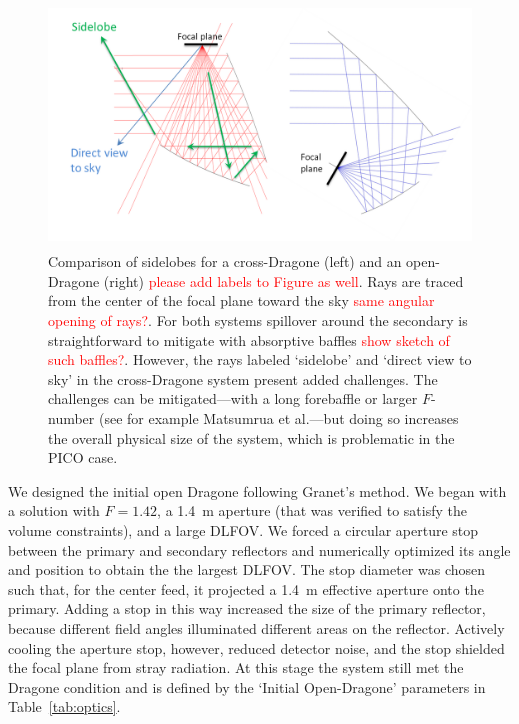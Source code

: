 \documentclass[]{spie}  %
\newcommand{\comr}[1]{\textcolor{red}{#1}}
\begin{document}
\begin{figure} [ht]
\begin{center}
\includegraphics[height=6.5cm]{sidelobes.png}
\end{center}
\caption { \label{fig:sidelobes} 
Comparison of sidelobes for a cross-Dragone (left) and an open-Dragone (right) \comr{please add labels to Figure as well}.  
Rays are traced from the center of the focal plane toward the sky \comr{same angular opening of rays?}.
For both systems spillover around the secondary is straightforward to mitigate with absorptive baffles \comr{show sketch of such baffles?}.  
However, the rays labeled `sidelobe' and `direct view to 
sky' in the cross-Dragone system present added challenges. The challenges can be mitigated---with a long forebaffle or larger $F$-number (see
for example Matsumrua et al.\cite{LB2016_optics}---but
doing so increases the overall physical size of the system, which is problematic in the PICO case.}
\end{figure} 

We designed the initial open Dragone following Granet's method\cite{granet2001}. 
We began with a solution with $F=1.42$, a 1.4~m aperture (that was verified to satisfy the volume constraints), and a large 
DLFOV.  We forced a circular aperture stop 
between the primary and secondary reflectors and numerically optimized its angle and position to obtain the 
the largest DLFOV.  The stop diameter was chosen such that, for the center feed, it projected a 
1.4~m effective aperture onto the primary. 
Adding a stop in this way increased the size of the primary reflector, because 
different field angles illuminated different areas on the reflector.
Actively cooling the aperture stop, however, reduced detector noise, and the stop shielded the 
focal plane from stray radiation. At this stage the system still met 
the Dragone condition and is defined by the `Initial Open-Dragone' parameters in Table~\ref{tab:optics}.
\end{document}
